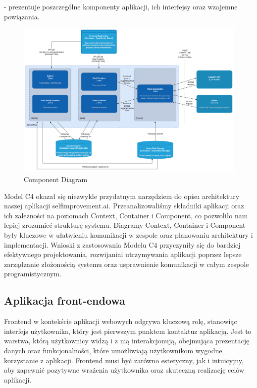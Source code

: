  - prezentuje poszczególne komponenty aplikacji, ich interfejsy oraz wzajemne powiązania.

\begin{figure}[H]
    \centering
    \includegraphics[width=1.1\textwidth]{Obrazy/c4_model/component_diagram.png}
    \caption{Component Diagram}
    \label{fig:my_label}
\end{figure}

Model C4 okazał się niezwykle przydatnym narzędziem do opisu architektury naszej aplikacji selfimprovement.ai. Przeanalizowaliśmy składniki aplikacji oraz ich zależności na poziomach Context, Container i Component, co pozwoliło nam lepiej zrozumieć strukturę systemu. Diagramy Context, Container i Component były kluczowe w ułatwieniu komunikacji w zespole oraz planowaniu architektury i implementacji. Wnioski z zastosowania Modelu C4 przyczyniły się do bardziej efektywnego projektowania, rozwijania\linebreak i utrzymywania aplikacji poprzez lepsze zarządzanie złożonością systemu oraz usprawnienie komunikacji w całym zespole programistycznym.
\clearpage

\subsection{Aplikacja front-endowa}
Frontend w kontekście aplikacji webowych odgrywa kluczową rolę, stanowiąc interfejs użytkownika, który jest pierwszym punktem kontaktu\linebreak z aplikacją. Jest to warstwa, którą użytkownicy widzą i z nią interakcjonują, obejmująca prezentację danych oraz funkcjonalności, które umożliwiają użytkownikom wygodne korzystanie z aplikacji. Frontend musi być zarówno estetyczny, jak i intuicyjny, aby zapewnić pozytywne wrażenia użytkownika oraz skuteczną realizację celów aplikacji.

